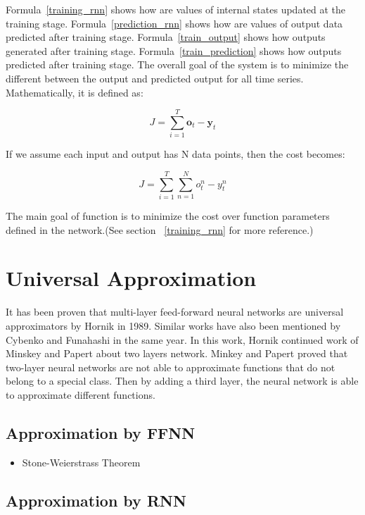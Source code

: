 \documentclass[officiallayout]{tktla}
\begin{document}
Formula~\ref{training_rnn} shows how are values of internal states updated at the training stage. Formula~\ref{prediction_rnn} shows how are values of output data predicted after training stage. Formula~\ref{train_output} shows how outputs generated after training stage. Formula~\ref{train_prediction} shows how outputs predicted after training stage. The overall goal of the system is to minimize the different between the output and predicted output for all time series. Mathematically, it is defined as:

\begin{equation}
J = \sum_{i=1}^{T}\mathbf{o}_{t} - \mathbf{y}_{t}
\end{equation}

If we assume each input and output has N data points, then the cost becomes:

\begin{equation}
J = \sum_{i=1}^{T}\sum_{n=1}^{N}o^n_{t} - y^n_{t}
\end{equation}

The main goal of function is to minimize the cost over function parameters defined in the network.(See section ~\ref{training_rnn} for more reference.)

\section{Universal Approximation}
It has been proven that multi-layer feed-forward neural networks are universal approximators by Hornik in 1989. Similar works have also been mentioned by Cybenko and Funahashi in the same year. In this work, Hornik continued work of Minskey and Papert about two layers network. Minkey and Papert proved that two-layer neural networks are not able to approximate functions that do not belong to a special class. Then 	by adding a third layer, the neural network is able to approximate different functions.

\subsection{Approximation by FFNN}
\begin{itemize}
\item Stone-Weierstrass Theorem
\end{itemize}
\subsection{Approximation by RNN}
\end{document}
